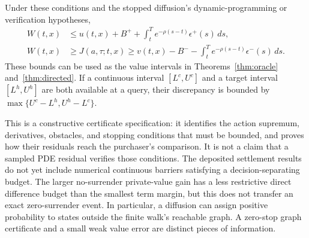 \begin{proposition}
\label{prop:continuousbarrier}
Under these conditions and the stopped diffusion's dynamic-programming or verification hypotheses,
\begin{align}
 W(t,x)&\leq u(t,x)+B^++\int_t^T e^{-\rho(s-t)}\epsilon^+(s)\,ds,\label{eq:continuousupper}\\
 W(t,x)&\geq J(a,\tau;t,x)
 \geq v(t,x)-B^--\int_t^T e^{-\rho(s-t)}\epsilon^-(s)\,ds.
 \label{eq:continuouslower}
\end{align}
These bounds can be used as the value intervals in Theorems~\ref{thm:oracle} and~\ref{thm:directed}. If a continuous interval $[L^c,U^c]$ and a target interval $[L^h,U^h]$ are both available at a query, their discrepancy is bounded by
$\max\{U^c-L^h,U^h-L^c\}$.
\end{proposition}

This is a constructive certificate specification: it identifies the action supremum, derivatives, obstacles, and stopping conditions that must be bounded, and proves how their residuals reach the purchaser's comparison. It is not a claim that a sampled PDE residual verifies those conditions. The deposited settlement results do not yet include numerical continuous barriers satisfying a decision-separating budget. The larger no-surrender private-value gain has a less restrictive direct difference budget than the smallest term margin, but this does not transfer an exact zero-surrender event. In particular, a diffusion can assign positive probability to states outside the finite walk's reachable graph. A zero-stop graph certificate and a small weak value error are distinct pieces of information.
